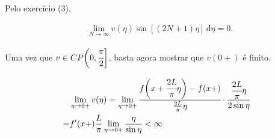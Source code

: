 \documentclass[12pt,a4paper]{article}
\begin{document}
		Pelo exerc\'icio (3),

		\begin{align}
			&\lim_{N \rightarrow \infty} v(\eta) \sin[(2N+1)\eta] \,\mathrm{d}\eta = 0.
		\end{align}

		Uma vez que $v \in CP\bigg(0, \cfrac{\pi}{2}\bigg]$, basta agora mostrar que $v(0+)$ \'e finito.

		\begin{align}
			&\lim_{\eta \rightarrow 0+} v(\eta) = \lim_{\eta \rightarrow 0+} \cfrac{f\bigg(x + \cfrac{2L}{\pi}\eta\bigg) - f(x+)}{\frac{2L}{\pi}\eta} \cdot \cfrac{\cfrac{2L}{\pi}\eta}{2 \sin \eta} \\
			= &f'(x+) \frac{L}{\pi} \lim_{\eta \rightarrow 0+} \frac{\eta}{\sin \eta} < \infty
		\end{align}
\end{document}
